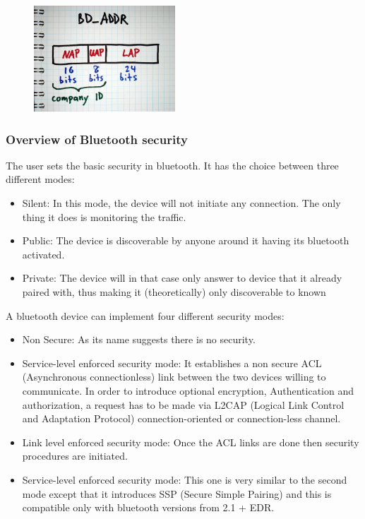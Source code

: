 \begin{figure}[!h]
  \begin{center}
	\includegraphics[width=200px]{images/bd_addr.jpg}
	\label{Bluetooth address}
  \end{center}
\end{figure}

\subsubsection{Overview of Bluetooth security}

The user sets the basic security in bluetooth. It has the choice between three different modes:
 \begin{itemize}
 	\item Silent: In this mode, the device will not initiate any connection. The only thing it does is monitoring the traffic.
 	\item Public: The device is discoverable by anyone around it having its bluetooth activated.
 	\item Private: The device will in that case only answer to device that it already paired with, thus making it (theoretically) only discoverable to known 
 \end{itemize}

A bluetooth device can implement four different security modes:
  \begin{itemize}
  	\item Non Secure: As its name suggests there is no security.
  	\item Service-level enforced security mode: It establishes a non secure ACL (Asynchronous connectionless) 	link between the two devices willing to communicate. In order to introduce optional encryption, Authentication and authorization, a request has to be made via L2CAP (Logical Link Control and Adaptation Protocol) connection-oriented or connection-less channel.
  	\item Link level enforced security mode: Once the ACL links are done then security procedures are initiated.
  	\item Service-level enforced security mode: This one is very similar to the second mode except that it introduces SSP (Secure Simple Pairing) and this is compatible only with bluetooth versions from 2.1 + EDR.
  \end{itemize}
  

